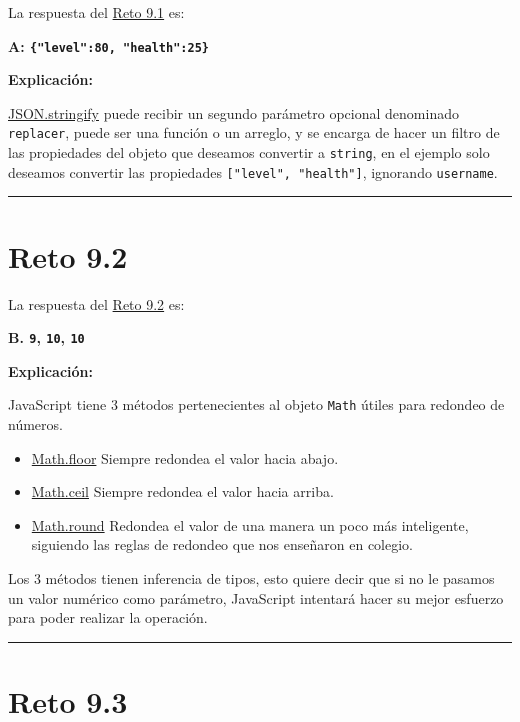 \documentclass[
  letterpaper,
  DIV=11,
  numbers=noendperiod]{scrreprt}
\begin{document}
La respuesta del \hyperref[sec-cap9-reto1]{Reto 9.1} es:

\textbf{A:
\texttt{\textquotesingle{}\{"level":80,\ "health":25\}\textquotesingle{}}}

\textbf{Explicación:}

\hyperref[glos-json_stringify]{JSON.stringify} puede recibir un segundo
parámetro opcional denominado \texttt{replacer}, puede ser una función o
un arreglo, y se encarga de hacer un filtro de las propiedades del
objeto que deseamos convertir a \texttt{string}, en el ejemplo solo
deseamos convertir las propiedades \texttt{{[}"level",\ "health"{]}},
ignorando \texttt{username}.

\begin{center}\rule{0.5\linewidth}{0.5pt}\end{center}

\section{Reto 9.2}\label{sec-sol-cap9-reto2}

La respuesta del \hyperref[sec-cap9-reto2]{Reto 9.2} es:

\textbf{B. \texttt{9}, \texttt{10}, \texttt{10}}

\textbf{Explicación:}

JavaScript tiene 3 métodos pertenecientes al objeto \texttt{Math} útiles
para redondeo de números.

\begin{itemize}
\item
  \hyperref[glos-math_floor]{Math.floor} Siempre redondea el valor hacia
  abajo.
\item
  \hyperref[glos-math_ceil]{Math.ceil} Siempre redondea el valor hacia
  arriba.
\item
  \hyperref[glos-math_round]{Math.round} Redondea el valor de una manera
  un poco más inteligente, siguiendo las reglas de redondeo que nos
  enseñaron en colegio.
\end{itemize}

Los 3 métodos tienen inferencia de tipos, esto quiere decir que si no le
pasamos un valor numérico como parámetro, JavaScript intentará hacer su
mejor esfuerzo para poder realizar la operación.

\begin{center}\rule{0.5\linewidth}{0.5pt}\end{center}

\section{Reto 9.3}\label{sec-sol-cap9-reto3}
\end{document}
